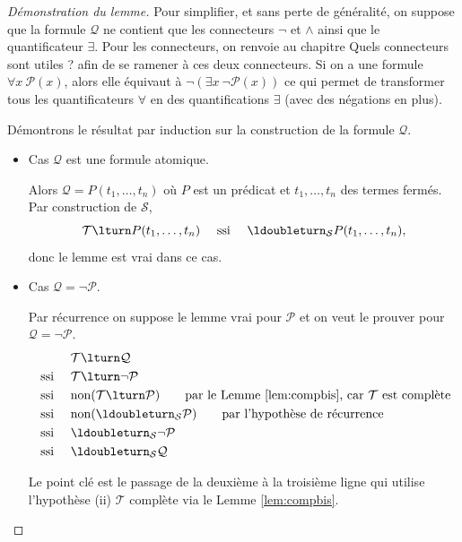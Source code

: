 \documentclass[11pt,class=report,crop=false]{standalone}
\begin{document}
\begin{proof}[Démonstration du lemme]
	Pour simplifier, et sans perte de généralité, on suppose que la formule $\mathcal{Q}$ ne contient que les connecteurs $\lnot$ et $\land$ ainsi que le quantificateur $\exists$. 
	Pour les connecteurs, on renvoie au chapitre \og{}Quels connecteurs sont utiles ?\fg{} afin de se ramener à ces deux connecteurs. Si on a une formule \og{}$\forall x\ \mathcal{P}(x)$\fg{}, alors elle équivaut à \og{}$\lnot(\exists x\ \lnot\mathcal{P}(x))$ \fg{} ce qui permet de transformer tous les quantificateurs $\forall$ en des quantifications $\exists$ (avec des négations en plus).
	
	Démontrons le résultat par induction sur la construction de la formule $\mathcal{Q}$.
	
	\begin{itemize}
		\item Cas $\mathcal{Q}$ est une formule atomique. 
		
		Alors $\mathcal{Q} = P(t_1, \ldots, t_n)$ où $P$ est un prédicat et $t_1,\ldots,t_n$ des termes fermés. Par construction de $\mathcal{S}$, 
		\[
		\mathcal{T} \lturn P(t_1, \ldots, t_n) \quad \text{ ssi } \quad \ldoubleturn_{\mathcal{S}} P(t_1, \ldots, t_n),
		\]
		donc le lemme est vrai dans ce cas.
		
		\item Cas $\mathcal{Q} = \lnot \mathcal{P}$. 
		
		Par récurrence on suppose le lemme vrai pour $\mathcal{P}$ et on veut le prouver pour $\mathcal{Q} = \lnot \mathcal{P}$.
		\begin{align*}
			& \mathcal{T} \lturn \mathcal{Q} \\
			\text{ ssi } \quad & \mathcal{T} \lturn \lnot \mathcal{P} \\
			\text{ ssi } \quad & \text{non}(\mathcal{T} \lturn \mathcal{P}) \qquad \text{par le Lemme \ref{lem:compbis}, car $\mathcal{T}$ est complète}\\
			\text{ ssi } \quad & \text{non}(\ldoubleturn_{\mathcal{S}} \mathcal{P}) \qquad \text{par l'hypothèse de récurrence}\\
			\text{ssi } \quad & \ldoubleturn_{\mathcal{S}} \lnot \mathcal{P}\\
			\text{ssi } \quad & \ldoubleturn_{\mathcal{S}} \mathcal{Q}			
		\end{align*}
		
		Le point clé est le passage de la deuxième à la troisième ligne qui utilise l'hypothèse (ii) $\mathcal{T}$ complète via le Lemme \ref{lem:compbis}.
		

\end{itemize}
\end{proof}
\end{document}
